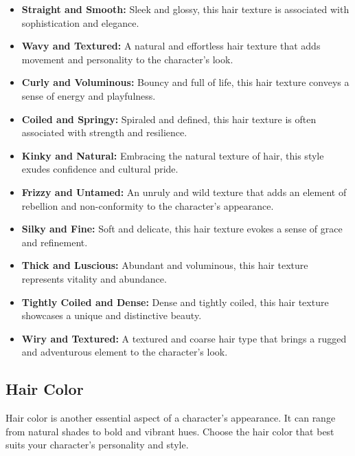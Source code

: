 \documentclass[12pt]{book}  %
\begin{document}
\begin{itemize}
    \item \textbf{Straight and Smooth:} Sleek and glossy, this hair texture is associated with sophistication and elegance.
    \item \textbf{Wavy and Textured:} A natural and effortless hair texture that adds movement and personality to the character's look.
    \item \textbf{Curly and Voluminous:} Bouncy and full of life, this hair texture conveys a sense of energy and playfulness.
    \item \textbf{Coiled and Springy:} Spiraled and defined, this hair texture is often associated with strength and resilience.
    \item \textbf{Kinky and Natural:} Embracing the natural texture of hair, this style exudes confidence and cultural pride.
    \item \textbf{Frizzy and Untamed:} An unruly and wild texture that adds an element of rebellion and non-conformity to the character's appearance.
    \item \textbf{Silky and Fine:} Soft and delicate, this hair texture evokes a sense of grace and refinement.
    \item \textbf{Thick and Luscious:} Abundant and voluminous, this hair texture represents vitality and abundance.
    \item \textbf{Tightly Coiled and Dense:} Dense and tightly coiled, this hair texture showcases a unique and distinctive beauty.
    \item \textbf{Wiry and Textured:} A textured and coarse hair type that brings a rugged and adventurous element to the character's look.
\end{itemize}

\subsection{\textbf{Hair Color}}

Hair color is another essential aspect of a character's appearance. It can range from natural shades to bold and vibrant hues. Choose the hair color that best suits your character's personality and style.
\end{document}
